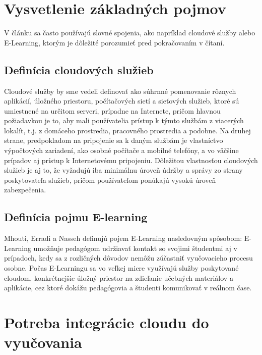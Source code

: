 \documentclass[10pt,slovak,a4paper]{article}%
\begin{document}
\section{Vysvetlenie základných pojmov}


V článku sa často používajú slovné spojenia, ako napríklad cloudové služby alebo E-Learning, ktorým je dôležité porozumieť pred pokračovaním v čítaní.


\subsection{Definícia cloudových služieb}


Cloudové služby by sme vedeli definovať ako súhrnné pomenovanie rôznych aplikácií, úložného priestoru, počítačových sietí a sieťových služieb, ktoré sú umiestnené na určitom serveri, prípadne na Internete, pričom hlavnou požiadavkou je to, aby mali používatelia prístup k týmto službám z viacerých lokalít, t.j. z domáceho prostredia, pracovného prostredia a podobne\cite{Babu_enrichingeducation}\cite{Narkar_cloud-basededucation}. Na druhej strane, predpokladom na pripojenie sa k daným službám je vlastníctvo výpočtových zariadení, ako osobné počítače a mobilné telefóny, a vo väčšine prípadov aj prístup k Internetovému pripojeniu. Dôležitou vlastnosťou cloudových služieb je aj to, že vyžadujú iba minimálnu úroveň údržby a správy zo strany poskytovateľa služieb, pričom používateľom ponúkajú vysokú úroveň zabezpečenia\cite{Babu_enrichingeducation}.  

\subsection{Definícia pojmu E-learning}


Mhouti, Erradi a Nasseh definujú pojem E-Learning nasledovným spôsobom:  E-Learning umožňuje pedagógom udržiavať kontakt so svojimi študentmi aj v prípadoch, kedy sa z rozličných dôvodov nemôžu zúčastniť vyučovacieho procesu osobne. Počas E-Learningu sa vo veľkej miere využívajú služby poskytované cloudom, konkrétnejšie úložný priestor na zdieľanie učebných materiálov a aplikácie, cez ktoré dokážu pedagógovia a študenti komunikovať v reálnom čase.  

\section{Potreba integrácie cloudu do vyučovania}
\end{document}
